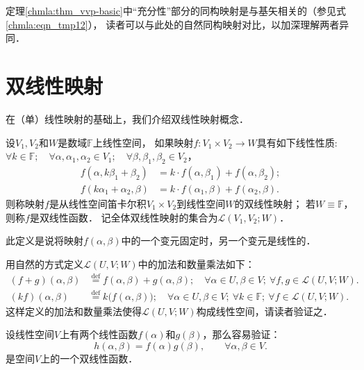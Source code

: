 定理\ref{chmla:thm_vvp-basic}中“充分性”部分的同构映射是与基矢相关的（参见式\eqref{chmla:eqn_tmp12}），
读者可以与此处的自然同构映射对比，以加深理解两者异同．




\section{双线性映射}\label{chmla:sec_double-linear-map}

在（单）线性映射的基础上，我们介绍双线性映射概念．

\begin{definition}\label{chmla:def_bilinear-fun}
    设$V_1, V_2$和$W$是数域$\mathbb{F}$上线性空间，
    如果映射$f:V_1 \times V_2 \to W$具有如下线性性质:
    $\forall k \in \mathbb{F}; \quad \forall \alpha, \alpha_1, \alpha_2 \in V_1;
     \quad \forall \beta , \beta_1, \beta_2 \in V_2 $，
    \begin{align*}
        f(\alpha, k\beta_1+ \beta_2)&= k\cdot f(\alpha, \beta_1) + f(\alpha,\beta_2); \\
        f(k\alpha_1+\alpha_2, \beta)&= k\cdot f(\alpha_1, \beta) + f(\alpha_2,\beta).
    \end{align*}
    则称映射$f$是从线性空间笛卡尔积$V_1 \times V_2 $到线性空间$W$的{\heiti 双线性映射}；
    若$W\equiv \mathbb{F}$，则称$f$是{\heiti 双线性函数}．
    记全体双线性映射的集合为$\mathscr{L}(V_1,V_2;W)$．
\end{definition}

此定义是说将映射$f(\alpha,\beta)$中的一个变元固定时，另一个变元是线性的．

用自然的方式定义$\mathscr{L}(U,V;W)$中的加法和数量乘法如下：
\begin{align*}
    (f+g)(\alpha,\beta)  &\overset{\mathrm {def}}{=}  f(\alpha,\beta)+g(\alpha,\beta); \quad
    \forall \alpha \in U, \beta \in V; \ \forall f,g \in \mathscr{L}(U,V;W) .  \\
    (k f) (\alpha,\beta) &\overset{\mathrm {def}}{=}  k \bigl( f(\alpha,\beta)\bigr); \quad
    \forall \alpha \in U,  \beta \in V;\ \forall k \in \mathbb{F}; \ \forall f \in \mathscr{L}(U,V;W) .
\end{align*}
这样定义的加法和数量乘法使得$\mathscr{L}(U,V;W)$构成线性空间，请读者验证之．

\begin{example}\label{chmla:exm_hfg}
    设线性空间$V$上有两个线性函数$f(\alpha)$和$g(\beta)$，那么容易验证：
    \begin{equation}
        h(\alpha,\beta) = f(\alpha) g(\beta), \qquad \forall \alpha,\beta \in V.
    \end{equation}
    是空间$V$上的一个双线性函数．
\end{example}

